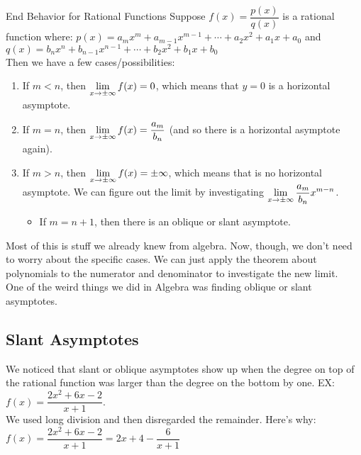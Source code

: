 \begin{thm}{End Behavior for Rational Functions}
Suppose $f(x)=\dfrac{p(x)}{q(x)}$ is a rational function where:
$p(x) = a_mx^m+a_{m-1}x^{m-1}+\cdots+a_2x^2+a_1x+a_0$ and\\
$q(x) = b_nx^n+b_{n-1}x^{n-1}+\cdots+b_2x^2+b_1x+b_0$\\

Then we have a few cases/possibilities:
\begin{enumerate}
  \item If $m<n$, then $\displaystyle \lim_{x\to\pm\infty} f(x)=0$, which means that $y=0$ is a horizontal asymptote.
  \item If $m=n$, then $\displaystyle \lim_{x\to\pm\infty} f(x) = \dfrac{a_m}{b_n}$ (and so there is a horizontal asymptote again).
  \item If $m>n$, then $\displaystyle \lim_{x\to\pm\infty} f(x)=\pm\infty$, which means that is no horizontal asymptote. We can figure out the limit by investigating $\displaystyle \lim_{x\to\pm\infty} \dfrac{a_m}{b_n} x^{m-n}$.
  \begin{itemize}
    \item If $m=n+1$, then there is an oblique or slant asymptote.
  \end{itemize}
\end{enumerate}
\end{thm}

Most of this is stuff we already knew from algebra. Now, though, we don't need to worry about the specific cases. We can just apply the theorem about polynomials to the numerator and denominator to investigate the new limit.\\

One of the weird things we did in Algebra was finding oblique or slant asymptotes.

\subsection*{Slant Asymptotes}

We noticed that slant or oblique asymptotes show up when the degree on top of the rational function was larger than the degree on the bottom by one. EX: $f(x)=\dfrac{2x^2+6x-2}{x+1}$.\\

We used long division and then disregarded the remainder. Here's why:\\

$f(x) = \dfrac{2x^2+6x-2}{x+1} = 2x+4- \dfrac{6}{x+1}$\\

